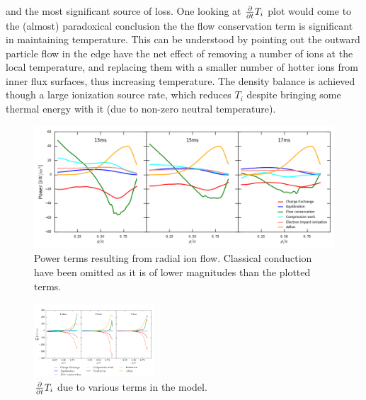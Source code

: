 and the most significant source of loss. One looking at $\partialt T_i$ plot would come to the (almost) paradoxical conclusion the the flow conservation term is significant in maintaining temperature. This can be understood by pointing out the outward particle flow in the edge have the net effect of removing a number of ions at the local temperature, and replacing them with a smaller number of hotter ions from inner flux surfaces, thus increasing temperature. The density balance is achieved though a large ionization source rate, which reduces $T_i$ despite bringing some thermal energy with it (due to non-zero neutral temperature).


\begin{figure}
    \centering
    \includegraphics[width = \textwidth]{ion_transport_results/power_terms_with_adhoc.png}
    \caption[Power terms resulting from radial ion flow]{Power terms resulting from radial ion flow. Classical conduction have been omitted as it is of lower magnitudes than the plotted terms.}
    \label{fig:power_terms_with_adhoc}
\end{figure}


\begin{figure}
    \centering
    \includegraphics[width = 0.4\textwidth]{ion_transport_results/dtempdt_with_adhoc.png}
    \caption[$\partialt T_i$ due to various terms]{$\partialt T_i$ due to various terms in the model.}
    \label{fig:temperature_change}
\end{figure}


